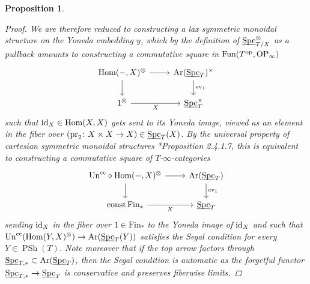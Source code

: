 \documentclass[reqno]{memo-l}
\theoremstyle{mythm}
\newtheorem{prop}[thm]{Proposition}
\theoremstyle{definition}
\numberwithin{equation}{section}
\DeclareMathOperator{\ev}{ev}
\DeclareMathOperator{\Spc}{Spc}
\renewcommand{\hom}{\textup{hom}}
\newcommand{\Fun}{{\textup{Fun}}}
\DeclareMathOperator{\PSh}{PSh}
\DeclareMathOperator{\Ar}{Ar}
\newcommand{\op}{{\textup{op}}}
\renewcommand{\hom}{{\textup{Hom}}}
\newcommand{\consts}{\textup{const}}
\newcommand{\id}{\textup{id}}
\newcommand{\pr}{\textup{pr}}
\newcommand{\Un}{\textup{Un}}
\newcommand{\ulhelper}[2]{\underline{\setbox0=\hbox{$#1#2$}\dp0=0.4pt \box0\relax}}
\newcommand{\ul}[1]{{\mathpalette\ulhelper{#1}}\hbox{\rule[-2pt]{0pt}{0pt}}}
\newcommand{\cc}{\text{cc}}
\begin{document}
\begin{prop}
\begin{proof}
        We are therefore reduced to constructing a lax symmetric monoidal structure on the Yoneda embedding $y$, which by the definition of $\ul\Spc_{T/X}^{\otimes}$ as a pullback amounts to constructing a commutative square in $\Fun(T^{\op},\text{OP}_\infty)$
        \[
            \begin{tikzcd}
                \hom(-,X)^\otimes\arrow[r]\arrow[d] & \Ar(\ul\Spc_T)^\times\arrow[d,"\ev_1"]\\
                1^\otimes\arrow[r,"X"'] & \ul\Spc_T^\times
            \end{tikzcd}
        \]
        such that $\id_X\in\hom(X,X)$ gets sent to its Yoneda image, viewed as an element in the fiber over $(\pr_2\colon X\times X\to X)\in\ul\Spc_T(X)$.
        By the universal property of cartesian symmetric monoidal structures \cite{HA}*{Proposition 2.4.1.7}, this is equivalent to constructing a commutative square of $T$-$\infty$-categories
        \begin{equation}\label{diag:lax-yoneda-before-un}
            \begin{tikzcd}
                \Un^\cc\circ \hom(-,X)^\otimes\arrow[r]\arrow[d] & \Ar(\ul\Spc_T)\arrow[d,"\ev_1"]\\
                \consts\,\text{Fin}_*\arrow[r,"X"'] & \ul\Spc_T
            \end{tikzcd}
        \end{equation}
        sending $\id_X$ in the fiber over $1\in\text{Fin}_*$ to the Yoneda image of $\id_X$ and such that $\Un^\cc(\hom(Y,X)^\otimes)\to\Ar(\ul\Spc_T(Y))$ satisfies the Segal condition for every $Y\in\PSh(T)$. Note moreover that if the top arrow factors through $\ul\Spc_{T,*}\subset\Ar(\ul\Spc_T)$, then the Segal condition is automatic as the forgetful functor $\ul\Spc_{T,*}\to\ul\Spc_T$ is conservative and preserves fiberwise limits.
        

\end{proof}
\end{prop}
\end{document}
